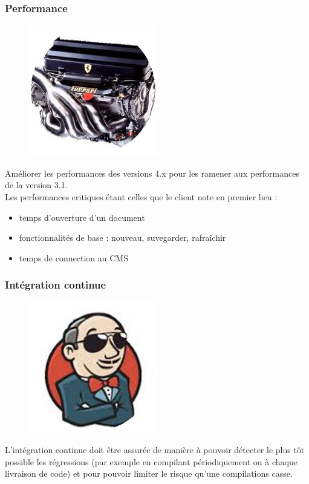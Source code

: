 \subsubsection{Performance}
\begin{figure}[H]
  \centering
      \includegraphics{images/performance.png}
\end{figure}
Améliorer les performances des versions 4.x pour les ramener aux performances de la version 3.1.\\
Les performances critiques étant celles que le client note en premier lieu :
\begin{itemize}
	\item temps d'ouverture d'un document
	\item fonctionnalités de base : nouveau, suvegarder, rafra\^{i}chir
	\item temps de connection au CMS
\end{itemize}


\subsubsection{Intégration continue}
\begin{figure}[H]
  \centering
      \includegraphics{images/ci.png}
\end{figure}
L'intégration continue doit être assurée de manière à pouvoir détecter le plus tôt possible les régressions (par exemple en compilant périodiquement ou à chaque livraison de code) et pour pouvoir limiter le risque qu'une compilations casse.\\


